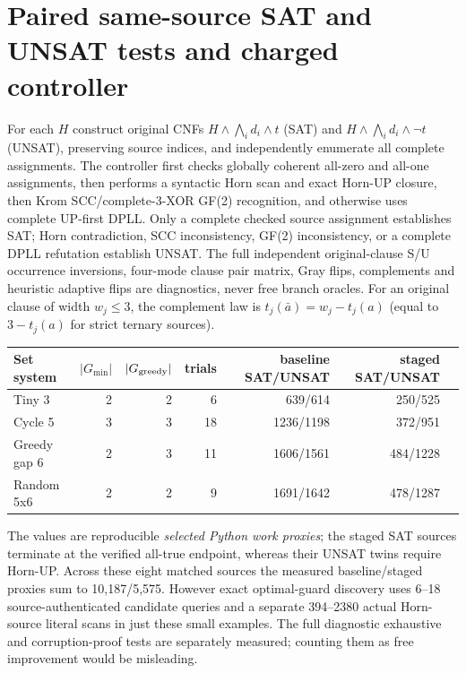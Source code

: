 \documentclass[11pt]{article}
\begin{document}
\section{Paired same-source SAT and UNSAT tests and charged controller}
For each $H$ construct original CNFs $H\land\bigwedge_i d_i\land t$ (SAT) and $H\land\bigwedge_i d_i\land\neg t$ (UNSAT), preserving source indices, and independently enumerate all complete assignments. The controller first checks globally coherent all-zero and all-one assignments, then performs a syntactic Horn scan and exact Horn-UP closure, then Krom SCC/complete-3-XOR GF(2) recognition, and otherwise uses complete UP-first DPLL. Only a complete checked source assignment establishes SAT; Horn contradiction, SCC inconsistency, GF(2) inconsistency, or a complete DPLL refutation establish UNSAT. The full independent original-clause S/U occurrence inversions, four-mode clause pair matrix, Gray flips, complements and heuristic adaptive flips are diagnostics, never free branch oracles. For an original clause of width $w_j\le3$, the complement law is $t_j(\bar a)=w_j-t_j(a)$ (equal to $3-t_j(a)$ for strict ternary sources).

\begin{center}\small\begin{tabular}{lrrrrrr}\toprule
Set system & $|G_{\min}|$ & $|G_{\rm greedy}|$ & trials & baseline SAT/UNSAT & staged SAT/UNSAT\\\midrule
Tiny 3 & 2&2&6&639/614&250/525\\
Cycle 5 &3&3&18&1236/1198&372/951\\
Greedy gap 6 &2&3&11&1606/1561&484/1228\\
Random 5x6 &2&2&9&1691/1642&478/1287\\\bottomrule
\end{tabular}\end{center}
The values are reproducible \emph{selected Python work proxies}; the staged SAT sources terminate at the verified all-true endpoint, whereas their UNSAT twins require Horn-UP. Across these eight matched sources the measured baseline/staged proxies sum to 10,187/5,575. However exact optimal-guard discovery uses 6--18 source-authenticated candidate queries and a separate 394--2380 actual Horn-source literal scans in just these small examples. The full diagnostic exhaustive and corruption-proof tests are separately measured; counting them as free improvement would be misleading.
\end{document}
